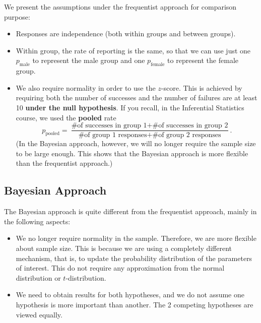 \documentclass{article}
\begin{document}
We present the assumptions under the frequentist approach for comparison purpose:
\begin{itemize}
	\item Responses are independence (both within groups and between groups).
	
	\item Within group, the rate of reporting is the same, so that we can use just one $p_\text{male}$ to represent the male group and one $p_\text{female}$ to represent the female group.
	
	\item We also require normality in order to use the $z$-score. This is achieved by requiring both the number of successes and the number of failures are at least 10 \textbf{under the null hypothesis}. If you recall, in the Inferential Statistics course, we used the \textbf{pooled} rate
	$$ p_\text{pooled} = \frac{\text{\# of successes in group 1} + \text{\# of successes in group 2}}{\text{\# of group 1 responses} + \text{\# of group 2 responses}}. $$
	(In the Bayesian approach, however, we will no longer require the sample size to be large enough. This shows that the Bayesian approach is more flexible than the frequentist approach.)
\end{itemize}

\subsection{Bayesian Approach}

The Bayesian approach is quite different from the frequentist approach, mainly in the following aspects:
\begin{itemize}
	\item We no longer require normality in the sample. Therefore, we are more flexible about sample size. This is because we are using a completely different mechanism, that is, to update the probability distribution of the parameters of interest. This do not require any approximation from the normal distribution or $t$-distribution.
	
	\item We need to obtain results for both hypotheses, and we do not assume one hypothesis is more important than another. The 2 competing hypotheses are viewed equally.
\end{itemize}
\end{document}
